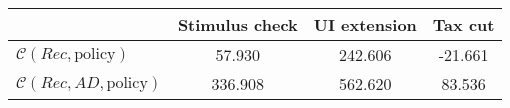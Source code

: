 \begin{tabular}{@{}lccc@{}} 
\toprule 
                          & Stimulus check      & UI extension    & Tax cut    \\  \midrule 
$\mathcal{C}(Rec,\text{policy})$ & 57.930  & 242.606  & -21.661     \\ 
$\mathcal{C}(Rec, AD,\text{policy})$ & 336.908  & 562.620  & 83.536     \\ 
\end{tabular}  
